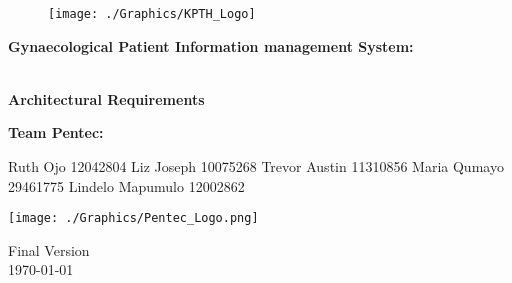 \begin{titlepage}
	\begin{center}
		
		\begin{figure}
			\centering
			\texttt{[image: ./Graphics/KPTH\_Logo]}
		\end{figure}		
		
		\textbf{\LARGE Gynaecological Patient Information
		management System:}
		
		\vspace{1 cm}
	    \textbf{\LARGE \\Architectural Requirements}
		
		\vspace{1 cm}
		\LARGE{\textbf{Team Pentec: }}
		

		\begin{flushright} \large
			
			Ruth Ojo 12042804\newline
			Liz Joseph 10075268\newline
			Trevor Austin 11310856\newline
			Maria Qumayo 29461775\newline
			Lindelo Mapumulo 12002862\newline
		\end{flushright}
		
				\vspace{1 cm}
				\centering
				\texttt{[image: ./Graphics/Pentec\_Logo.png]}

		
		
		{\LARGE Final Version}
		\\
		{\large \today}		
		
		
	\end{center}
\end{titlepage}
